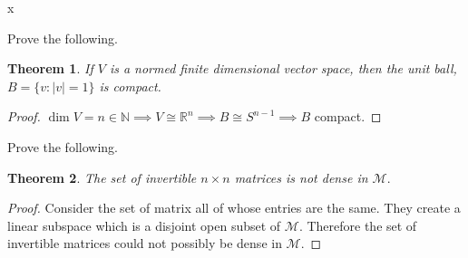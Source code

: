 \documentclass[letter]{article}
\newtheorem{theorem}{Theorem}
\newenvironment{menumerate}{%
  \edef\backupindent{\the\parindent}%
  \enumerate%
  \setlength{\parindent}{\backupindent}%
}{\endenumerate}
\begin{document}
\begin{menumerate}
	\setcounter{enumi}{3}
	\item %

	\setcounter{enumi}{5}
	\item %
	x

	\setcounter{enumi}{11}
	\item Prove the following.
	\begin{theorem}
		If $V$ is a normed finite dimensional vector space, then the unit ball, $B = \{v:|v| =1\}$ is compact.
	\end{theorem}
	\begin{proof}
	$\dim V = n \in \mathbb{N} \implies V \cong \mathbb{R}^n \implies B \cong S^{n-1 } \implies B$ compact.	 
	\end{proof} 

	\item Prove the following.
	\begin{theorem}
		The set of invertible $n\times n$ matrices is not dense in $\mathcal{M}.$
	\end{theorem}
	\begin{proof}
		Consider the set of matrix all of whose entries are the same. They create a linear subspace
		which is a disjoint open subset of $\mathcal{M}.$ Therefore the set of invertible matrices could
		not possibly be dense in $\mathcal{M}.$	 
	\end{proof}
\end{menumerate}
\end{document}
